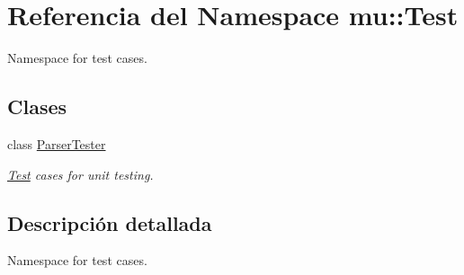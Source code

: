 \hypertarget{namespacemu_1_1_test}{}\section{Referencia del Namespace mu\+:\+:Test}
\label{namespacemu_1_1_test}


Namespace for test cases.  


\subsection*{Clases}
\begin{DoxyCompactItemize}
\item 
class \hyperlink{classmu_1_1_test_1_1_parser_tester}{Parser\+Tester}
\begin{DoxyCompactList}\small\item\em \hyperlink{namespacemu_1_1_test}{Test} cases for unit testing. \end{DoxyCompactList}\end{DoxyCompactItemize}


\subsection{Descripción detallada}
Namespace for test cases. 